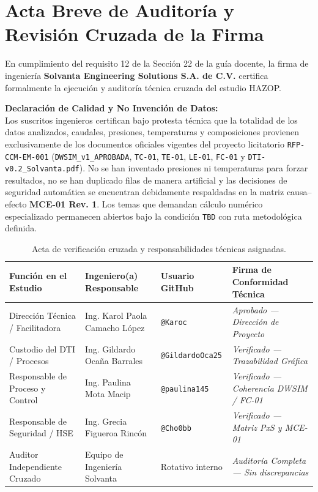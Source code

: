 \documentclass[10pt,letterpaper]{article}
\begin{document}
\section{Acta Breve de Auditoría y Revisión Cruzada de la Firma}
En cumplimiento del requisito 12 de la Sección 22 de la guía docente, la firma de ingeniería \textbf{Solvanta Engineering Solutions S.A. de C.V.} certifica formalmente la ejecución y auditoría técnica cruzada del estudio HAZOP.

\begin{tcolorbox}[colframe=navyblue,colback=boxbg,arc=2mm,boxrule=0.8pt]
    \textbf{\color{navyblue}\large Declaración de Calidad y No Invención de Datos:}\\[4pt]
    \small Los suscritos ingenieros certifican bajo protesta técnica que la totalidad de los datos analizados, caudales, presiones, temperaturas y composiciones provienen exclusivamente de los documentos oficiales vigentes del proyecto licitatorio \texttt{RFP-CCM-EM-001} (\texttt{DWSIM\_v1\_APROBADA}, \texttt{TC-01}, \texttt{TE-01}, \texttt{LE-01}, \texttt{FC-01} y \texttt{DTI-v0.2\_Solvanta.pdf}). No se han inventado presiones ni temperaturas para forzar resultados, no se han duplicado filas de manera artificial y las decisiones de seguridad automática se encuentran debidamente respaldadas en la matriz causa--efecto \textbf{MCE-01 Rev. 1}. Los temas que demandan cálculo numérico especializado permanecen abiertos bajo la condición \texttt{TBD} con ruta metodológica definida.
\end{tcolorbox}
\vspace{0.4cm}

\begin{table}[H]
\centering\small
\caption{Acta de verificación cruzada y responsabilidades técnicas asignadas.} \label{tab:acta_firmas}
\begin{tabularx}{\textwidth}{p{3.8cm} p{4.2cm} p{2.8cm} X}
\toprule
\textbf{Función en el Estudio} & \textbf{Ingeniero(a) Responsable} & \textbf{Usuario GitHub} & \textbf{Firma de Conformidad Técnica} \\
\midrule
Dirección Técnica / Facilitadora & Ing. Karol Paola Camacho López & \texttt{@Karoc} & \textit{Aprobado --- Dirección de Proyecto} \\
Custodio del DTI / Procesos & Ing. Gildardo Ocaña Barrales & \texttt{@GildardoOca25} & \textit{Verificado --- Trazabilidad Gráfica} \\
Responsable de Proceso y Control & Ing. Paulina Mota Macip & \texttt{@paulina145} & \textit{Verificado --- Coherencia DWSIM / FC-01} \\
Responsable de Seguridad / HSE & Ing. Grecia Figueroa Rincón & \texttt{@Cho0bb} & \textit{Verificado --- Matriz PxS y MCE-01} \\
Auditor Independiente Cruzado & Equipo de Ingeniería Solvanta & Rotativo interno & \textit{Auditoría Completa --- Sin discrepancias} \\
\bottomrule
\end{tabularx}
\end{table}
\newpage
\end{document}
